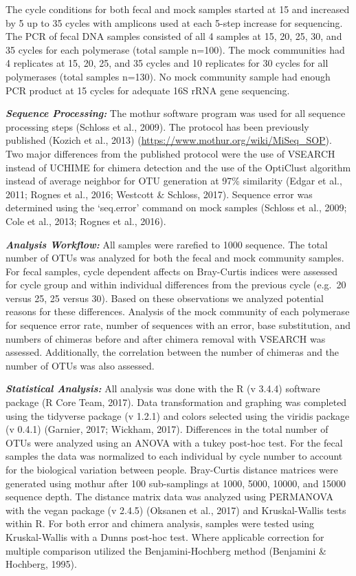 \documentclass[12pt,]{article}
\begin{document}
The cycle conditions for both fecal and mock samples started at 15 and
increased by 5 up to 35 cycles with amplicons used at each 5-step
increase for sequencing. The PCR of fecal DNA samples consisted of all 4
samples at 15, 20, 25, 30, and 35 cycles for each polymerase (total
sample n=100). The mock communities had 4 replicates at 15, 20, 25, and
35 cycles and 10 replicates for 30 cycles for all polymerases (total
samples n=130). No mock community sample had enough PCR product at 15
cycles for adequate 16S rRNA gene sequencing.

\textbf{\emph{Sequence Processing:}} The mothur software program was
used for all sequence processing steps (Schloss et al., 2009). The
protocol has been previously published (Kozich et al., 2013)
(\url{https://www.mothur.org/wiki/MiSeq_SOP}). Two major differences
from the published protocol were the use of VSEARCH instead of UCHIME
for chimera detection and the use of the OptiClust algorithm instead of
average neighbor for OTU generation at 97\% similarity (Edgar et al.,
2011; Rognes et al., 2016; Westcott \& Schloss, 2017). Sequence error
was determined using the `seq.error' command on mock samples (Schloss et
al., 2009; Cole et al., 2013; Rognes et al., 2016).

\textbf{\emph{Analysis Workflow:}} All samples were rarefied to 1000
sequence. The total number of OTUs was analyzed for both the fecal and
mock community samples. For fecal samples, cycle dependent affects on
Bray-Curtis indices were assessed for cycle group and within individual
differences from the previous cycle (e.g.~20 versus 25, 25 versus 30).
Based on these observations we analyzed potential reasons for these
differences. Analysis of the mock community of each polymerase for
sequence error rate, number of sequences with an error, base
substitution, and numbers of chimeras before and after chimera removal
with VSEARCH was assessed. Additionally, the correlation between the
number of chimeras and the number of OTUs was also assessed.

\textbf{\emph{Statistical Analysis:}} All analysis was done with the R
(v 3.4.4) software package (R Core Team, 2017). Data transformation and
graphing was completed using the tidyverse package (v 1.2.1) and colors
selected using the viridis package (v 0.4.1) (Garnier, 2017; Wickham,
2017). Differences in the total number of OTUs were analyzed using an
ANOVA with a tukey post-hoc test. For the fecal samples the data was
normalized to each individual by cycle number to account for the
biological variation between people. Bray-Curtis distance matrices were
generated using mothur after 100 sub-samplings at 1000, 5000, 10000, and
15000 sequence depth. The distance matrix data was analyzed using
PERMANOVA with the vegan package (v 2.4.5) (Oksanen et al., 2017) and
Kruskal-Wallis tests within R. For both error and chimera analysis,
samples were tested using Kruskal-Wallis with a Dunns post-hoc test.
Where applicable correction for multiple comparison utilized the
Benjamini-Hochberg method (Benjamini \& Hochberg, 1995).
\end{document}
